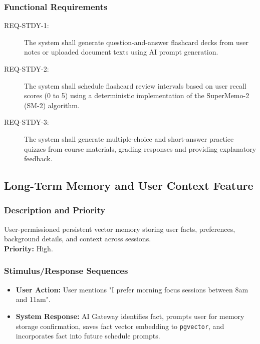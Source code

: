\documentclass[11pt,a4paper]{article}
\begin{document}
\subsubsection{Functional Requirements}
\begin{description}
    \item[REQ-STDY-1:] The system shall generate question-and-answer flashcard decks from user notes or uploaded document texts using AI prompt generation.
    \item[REQ-STDY-2:] The system shall schedule flashcard review intervals based on user recall scores (0 to 5) using a deterministic implementation of the SuperMemo-2 (SM-2) algorithm.
    \item[REQ-STDY-3:] The system shall generate multiple-choice and short-answer practice quizzes from course materials, grading responses and providing explanatory feedback.
\end{description}

\subsection{Long-Term Memory and User Context Feature}
\subsubsection{Description and Priority}
User-permissioned persistent vector memory storing user facts, preferences, background details, and context across sessions. \\
\textbf{Priority:} High.

\subsubsection{Stimulus/Response Sequences}
\begin{itemize}
    \item \textbf{User Action:} User mentions "I prefer morning focus sessions between 8am and 11am".
    \item \textbf{System Response:} AI Gateway identifies fact, prompts user for memory storage confirmation, saves fact vector embedding to \texttt{pgvector}, and incorporates fact into future schedule prompts.
\end{itemize}
\end{document}
